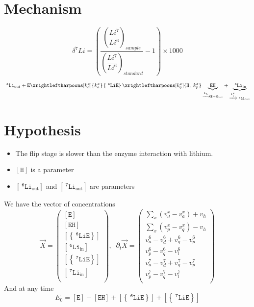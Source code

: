 \documentclass[aps,onecolumn,11pt]{revtex4}
\newcommand{\mychem}[1]{\mathtt{#1}}
\newcommand{\myconc}[1]{\left\lbrack{#1}\right\rbrack}
\newcommand{\spLi}[1]{{~^{\mychem{#1}}\mychem{Li}}}
\newcommand{\spEout}{\mychem{E}}
\newcommand{\Eout}{\myconc{\spEout}}
\newcommand{\spLiE}[1]{\left\lbrace\spLi{#1}\spEout\right\rbrace}
\newcommand{\LiE}[1]{\myconc{\spLiE{#1}}}
\newcommand{\spLiIn}[1]{{\spLi{#1}}_{\mathrm{in}}}
\newcommand{\LiIn}[1]{\myconc{\spLiIn{#1}}}
\newcommand{\spLiOut}[1]{{\spLi{#1}}_{\mathrm{out}}}
\newcommand{\LiOut}[1]{\myconc{\spLiOut{#1}}}
\newcommand{\spEHin}{\mychem{EH}}
\newcommand{\EHin}{\myconc{\spEHin}}
\newcommand{\spproton}{\mychem{H}}
\newcommand{\proton}{\myconc{\spproton}}
\begin{document}
\section{Mechanism}
$$
	\delta^7Li = \left(
		\dfrac{\left(\dfrac{Li^7}{Li^6}\right)_{sample}}
		{\left(\dfrac{Li^7}{Li^6}\right)_{standard}}
		 -1 
	\right) \times 1000
$$


\begin{equation}
	 \spLiOut{x} +  \spEout  
	 \xrightleftharpoons[k_d^x]{k_a^x} 
	 \spLiE{x}
	  \xrightleftharpoons[k_q^x]{\mychem{H},\;k_p^x} \underbrace{\spEHin}_{\xrightarrow[]{k_h} \mychem{E} + \mychem{H}_{\mathrm{out}}} + \underbrace{\spLiIn{x}}_{\xrightarrow[]{k_l^x} \spLiOut{x}}
\end{equation}

\section{Hypothesis}
\begin{itemize}
\item The flip stage is slower than the enzyme interaction with lithium.
\item $\proton$ is a parameter
\item $\LiOut{6}$ and  $\LiOut{7}$ are parameters
\end{itemize}


We have the vector of concentrations
\begin{equation}
	\vec{X} = 
	\begin{pmatrix}
	\Eout\\
	\EHin\\
	\LiE{6}\\
	\LiIn{6}\\
	\LiE{7}\\
	\LiIn{7}\\
	\end{pmatrix},\;\;
	\partial_t \vec{X} =
	\begin{pmatrix}
	\sum_x\left(v_d^x-v_a^x\right) + v_h\\
	\sum_x\left(v_p^x-v_q^x\right) - v_h\\
	v_a^6-v_d^6+v_q^6-v_p^6\\
	v_p^6-v_q^6-v_l^6\\
	v_a^7-v_d^7+v_q^7-v_p^7\\
	v_p^7-v_q^7-v_l^7\\
	\end{pmatrix}
\end{equation}
And at any time
\begin{equation} 
	\label{eq:E0}
	E_0 = \Eout + \EHin +  \LiE{6} + \LiE{7}
\end{equation}
\end{document}
